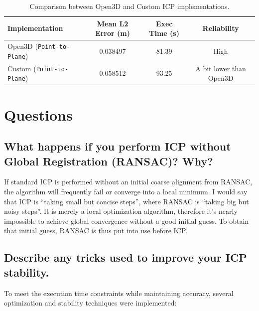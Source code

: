 \documentclass{article}
\begin{document}
\begin{table}[H]
    \centering
    \begin{tabular}{@{}lccc@{}}
        \toprule
            \textbf{Implementation} & \textbf{Mean L2 Error (m)} & \textbf{Exec Time (s)} & \textbf{Reliability} \\ \midrule
            Open3D (\texttt{Point-to-Plane}) & 0.038497 & 81.39 & High \\
            Custom (\texttt{Point-to-Plane}) & 0.058512 & 93.25 & A bit lower than Open3D \\
        \bottomrule
    \end{tabular}
    \caption{Comparison between Open3D and Custom ICP implementations.}
\end{table}

\section{Questions}

\subsection{What happens if you perform ICP without Global Registration (RANSAC)? Why?}
If standard ICP is performed without an initial coarse alignment from RANSAC, the algorithm will frequently fail or 
converge into a local minimum. I would say that ICP is ``taking small but concise steps'', where RANSAC is ``taking big but noisy steps''. 
It is merely a local optimization algorithm, therefore it's nearly impossible to achieve global convergence without a good initial guess. 
To obtain that initial guess, RANSAC is thus put into use before ICP.

\subsection{Describe any tricks used to improve your ICP stability.}
To meet the execution time constraints while maintaining accuracy, 
several optimization and stability techniques were implemented:
\end{document}
